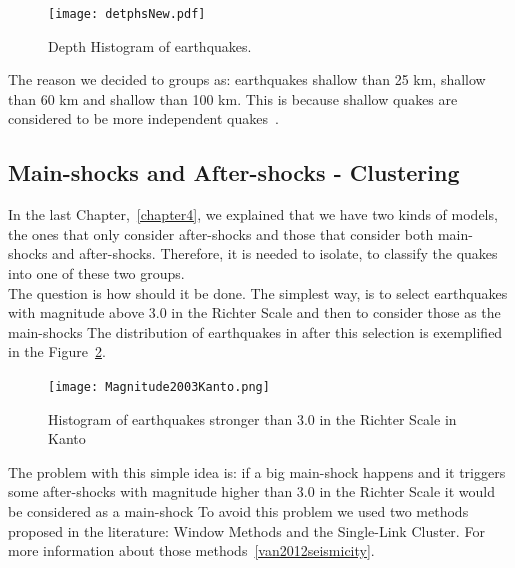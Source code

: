 \begin{figure}[!htb]
	\centering
	\texttt{[image: detphsNew.pdf]}
	\caption{Depth Histogram of earthquakes.}
	\label{histogramQuakes}
\end{figure}

The reason we decided to groups as: earthquakes shallow than 25 km, shallow than 60 km and shallow than 100 km. This is because shallow quakes are considered to be more independent quakes~\cite{yamanaka1990scaling}.

\subsection{Main-shocks and After-shocks - Clustering}\label{Clustering}

In the last Chapter,~\ref{chapter4}, we explained that we have two kinds of models, the ones that only consider after-shocks and those that consider both main-shocks and after-shocks. Therefore, it is needed to isolate, to classify the quakes into one of these two groups.\\

The question is how should it be done. The simplest way, is to select earthquakes with magnitude above 3.0 in the Richter Scale and then to consider those as the main-shocks The distribution of earthquakes in after this selection is exemplified in the Figure~\ref{quakesKanto}.\\

\begin{figure}[!htb]
	\centering
	\texttt{[image: Magnitude2003Kanto.png]}
	\caption{Histogram of earthquakes stronger than 3.0 in the Richter Scale in Kanto}
	\label{quakesKanto}
\end{figure}

The problem with this simple idea is: if a big main-shock happens and it triggers some after-shocks with magnitude higher than 3.0 in the Richter Scale it would be considered as a main-shock To avoid this problem we used two methods proposed in the literature: Window Methods and the Single-Link Cluster. For more information about those methods~\ref{van2012seismicity}.\\ 